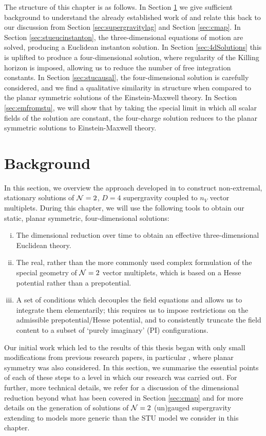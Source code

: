 The structure of this chapter is as follows. In Section \ref{sec:stusolbg} we give sufficient background to understand the already established work of \cite{Mohaupt:2011aa, Errington:2014bta, Dempster:2015, Dempster:2016} and relate this back to our discussion from Section \ref{sec:supergravitylag} and Section \ref{sec:cmap}. In Section \ref{sec:stueucinstanton}, the three-dimensional equations of motion are solved, producing a Euclidean instanton solution. In Section \ref{sec:4dSolutions} this is uplifted to produce a four-dimensional solution, where regularity of the Killing horizon is imposed, allowing us to reduce the number of free integration constants. In Section \ref{sec:stucausal}, the four-dimensional solution is carefully considered, and we find a qualitative similarity in structure when compared to the planar symmetric solutions of the Einstein-Maxwell theory. In Section \ref{sec:emfromstu}, we will show that by taking the special limit in which all scalar fields of the solution are constant, the four-charge solution reduces to the planar symmetric solutions to Einstein-Maxwell theory.

\section{Background}
\label{sec:stusolbg}

In this section, we overview the approach developed in \cite{Mohaupt:2011aa, Errington:2014bta, Dempster:2015, Dempster:2016} to construct non-extremal, stationary solutions of ${\cal N}=2$, $D=4$ supergravity coupled to $n_V$ vector multiplets. During this chapter, we will use the following tools to obtain our static, planar symmetric, four-dimensional solutions:
\begin{enumerate}[(i)]
\item
The dimensional reduction over time to obtain an effective three-dimensional Euclidean theory.
\item
The real, rather than the more commonly used complex formulation of the special geometry of ${\cal N}=2$ vector multiplets, which is based on a Hesse potential rather than a prepotential.
\item
A set of conditions which decouples the field equations and allows us to integrate them elementarily; this requires us to impose restrictions on the admissible prepotential/Hesse potential, and to consistently truncate the field content to a subset of `purely imaginary' (PI) configurations.
\end{enumerate}
Our initial work which led to the results of this thesis began with only small modifications from previous research papers, in particular \cite{Dempster:2015}, where planar symmetry was also considered. In this section, we summarise the essential points of each of these steps to a level in which our research was carried out. For further, more technical details, we refer \cite{Mohaupt:2011aa} for a discussion of the dimensional reduction beyond what has been covered in Section \ref{sec:cmap} and \cite{Errington:2014bta, Dempster:2015, Gutowski:2019iyo} for more details on the generation of solutions of ${\cal N} =2$ (un)gauged supergravity extending to models more generic than the STU model we consider in this chapter.

